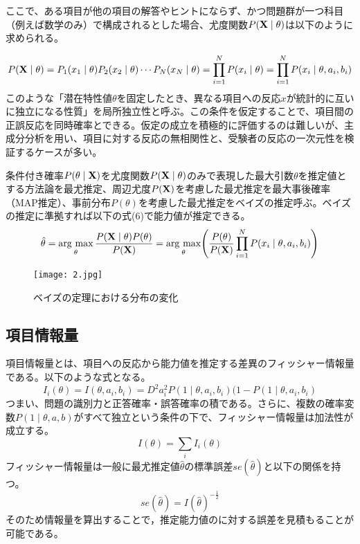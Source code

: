 \documentclass[12pt]{jarticle}
\begin{document}
ここで、ある項目が他の項目の解答やヒントにならず、かつ問題群が一つ科目（例えば数学のみ）で構成されるとした場合、尤度関数$P({\bf X} \mid \theta)$は以下のように求められる。

\begin{equation}
P({\bf X} \mid \theta) = P_{1}(x_1 \mid \theta)P_{2}(x_2 \mid \theta)\cdots P_{N}(x_N \mid \theta)= \prod_{i=1}^N P(x_{i} \mid \theta) = \prod_{i=1}^N P(x_{i} \mid \theta, a_i, b_i)
\end{equation}
このような「潜在特性値$\theta$を固定したとき、異なる項目への反応$x$が統計的に互いに独立になる性質」を局所独立性と呼ぶ。この条件を仮定することで、項目間の正誤反応を同時確率とできる。仮定の成立を積極的に評価するのは難しいが、主成分分析を用い、項目に対する反応の無相関性と、受験者の反応の一次元性を検証するケースが多い。

条件付き確率$P(\theta \mid {\bf X})$を尤度関数$P({\bf X} \mid \theta)$のみで表現した最大引数$\theta$を推定値とする方法論を最尤推定、周辺尤度$P({\bf X})$を考慮した最尤推定を最大事後確率（MAP推定）、事前分布$P(\theta)$を考慮した最尤推定をベイズの推定呼ぶ。ベイズの推定に準拠すれば以下の式(6)で能力値が推定できる。
\begin{equation}
\hat{\theta}=\mathop{\rm arg~max}\limits_\theta \frac{P({\bf X} \mid \theta) P(\theta)}{P(\bf{X)}}=\mathop{\rm arg~max}\limits_\theta \Biggl( \frac{P(\theta)}{P({\bf X})}\prod_{i=1}^N P(x_{i} \mid \theta, a_i, b_i) \Biggr)
\end{equation}

\begin{figure}[H]
 \centering
 \texttt{[image: 2.jpg]}
 \caption{ベイズの定理における分布の変化}
\end{figure}

\subsection{項目情報量}
項目情報量とは、項目への反応から能力値を推定する差異のフィッシャー情報量である。以下のような式となる。
\begin{equation}
I_i(\theta)=I(\theta,a_i,b_i)=D^2a_i^2P(1 \mid \theta,a_i,b_i)(1-P(1 \mid \theta,a_i,b_i)
\end{equation}
つまい、問題の識別力と正答確率・誤答確率の積である。さらに、複数の確率変数$P(1 \mid \theta, a, b)$がすべて独立という条件の下で、フィッシャー情報量は加法性が成立する。
\begin{equation}
I(\theta)=\sum_i I_i(\theta)
\end{equation}
フィッシャー情報量は一般に最尤推定値$\hat{\theta}$の標準誤差$se(\hat{\theta})$と以下の関係を持つ。
\begin{equation}
se(\hat{\theta})=I(\hat{\theta})^{-\frac{1}{2}}
\end{equation}
そのため情報量を算出することで，推定能力値のに対する誤差を見積もることが可能である。
\end{document}
